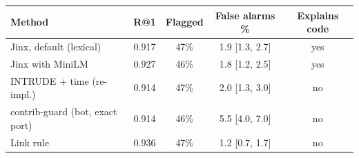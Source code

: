 \begin{tabular}{@{}lcccc@{}}\toprule
Method & R@1 & Flagged & False alarms \% & Explains code \\\midrule
\rowcolor{jinxrow}Jinx, default (lexical) & 0.917 & 47\% & 1.9 [1.3, 2.7] & yes \\
Jinx with MiniLM & 0.927 & 46\% & 1.8 [1.2, 2.5] & yes \\
INTRUDE + time (re-impl.) & 0.914 & 47\% & 2.0 [1.3, 3.0] & no \\
contrib-guard (bot, exact port) & 0.914 & 46\% & 5.5 [4.0, 7.0] & no \\
Link rule & 0.936 & 47\% & 1.2 [0.7, 1.7] & no \\
\bottomrule\end{tabular}
